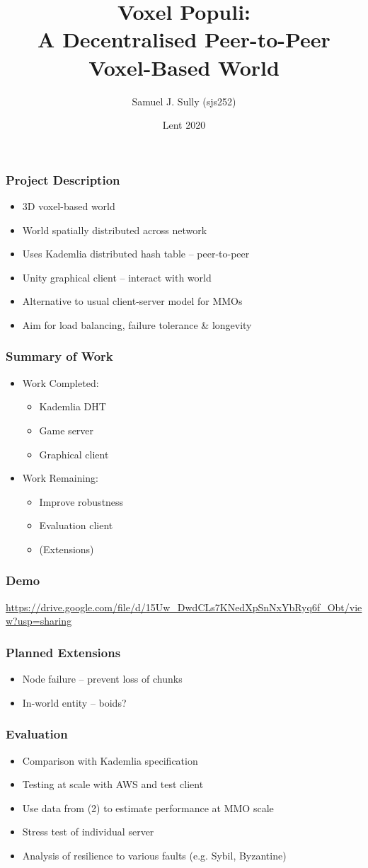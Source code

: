 \documentclass{beamer}
\title{Voxel Populi:\\A Decentralised Peer-to-Peer Voxel-Based World}
\author{Samuel J. Sully (sjs252)}
\date{Lent 2020}
\begin{document}
		
	\frame{\titlepage}
		
	\begin{frame}
		\frametitle{Project Description}
		\pause
		\begin{itemize}
			\item<2-> 3D voxel-based world
			\item<3-> World spatially distributed across network
			\item<4-> Uses Kademlia distributed hash table -- peer-to-peer
			\item<5-> Unity graphical client -- interact with world
			\item<6-> Alternative to usual client-server model for MMOs
			\item<7-> Aim for load balancing, failure tolerance \& longevity
		\end{itemize}
	\end{frame}
	\begin{frame}
		\frametitle{Summary of Work}
		\pause
		\begin{itemize}
			\item<2->Work Completed:
			\begin{itemize}
				\item Kademlia DHT
				\item Game server
				\item Graphical client
			\end{itemize}
			\item<3->Work Remaining:
			\begin{itemize}
				\item Improve robustness
				\item Evaluation client
				\item (Extensions)
			\end{itemize}
		\end{itemize}
	\end{frame}
	\begin{frame}
		\frametitle{Demo}
		\url{https://drive.google.com/file/d/15Uw_DwdCLs7KNedXpSnNxYbRyq6f_Obt/view?usp=sharing}
	\end{frame}
	\begin{frame}
		\frametitle{Planned Extensions}
		\pause
		\begin{itemize}
			\item<2-> Node failure -- prevent loss of chunks
			\item<3-> In-world entity -- boids?
		\end{itemize}
	\end{frame}
	\frame{\titlepage}
	\begin{frame}
		\frametitle{Evaluation}
		\begin{itemize}
			\item Comparison with Kademlia specification
			\item Testing at scale with AWS and test client
			\item Use data from (2) to estimate performance at MMO scale
			\item Stress test of individual server
			\item Analysis of resilience to various faults (e.g. Sybil, Byzantine)
		\end{itemize}		
	\end{frame}
\end{document}

